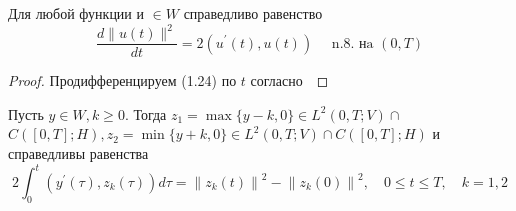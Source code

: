 \begin{lemma}
    \label{lm:1_5:32}
    Для любой функции и $\in W$ справедливо равенство
    \[
        \frac{d\|u(t)\|^{2}}{d t}=2\left(u^{\prime}(t),
        u(t)\right) \quad \text { n.8. нa }(0, T)
    \]
\end{lemma}

\begin{proof}
    Продифференцируем (1.24) по $t$ согласно~\cite[356]{Kolmogorov2004}
\end{proof}

\begin{lemma}
    \label{lm:1_5:33}
    Пусть $y \in W, k \geq 0$.
    Тогда $z_{1}=\max \{y-k, 0\} \in L^{2}(0, T ; V)
    \cap$ $C([0, T] ; H), z_{2}=
    \min \{y+k, 0\} \in L^{2}(0, T ; V) \cap C([0, T] ; H)$
    и справедливы равенства
    \[
        2 \int_{0}^{t}\left(y^{\prime}(\tau), z_{k}(\tau)\right) d \tau=
        \left\|z_{k}(t)\right\|^{2}
        -\left\|z_{k}(0)\right\|^{2}, \quad 0 \leq t \leq T, \quad k=1,2
    \]
\end{lemma}

